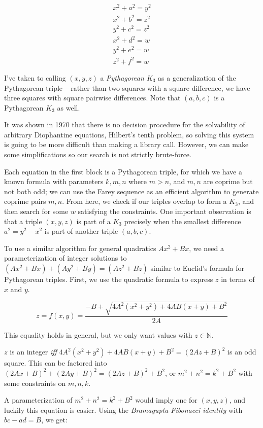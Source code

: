 \documentclass[a4paper]{amsproc}
\theoremstyle{plain}
\newcommand{\N} {\mathbb{N}}
\begin{document}
$$
\begin{matrix}
x^2 + a^2 = y^2 \\
x^2 + b^2 = z^2 \\
y^2 + c^2 = z^2 \\
x^2 + d^2 = w \\
y^2 + e^2 = w \\
z^2 + f^2 = w
\end{matrix}
$$

I've taken to calling $(x,y,z)$ a \textit{Pythagorean $K_3$} as a generalization of the Pythagorean triple --
rather than two squares with a square difference, we have three squares with square pairwise differences.
Note that $(a,b,c)$ is a Pythagorean $K_3$ as well.

It was shown in 1970 that there is no decision procedure for the solvability of arbitrary Diophantine equations, Hilbert's tenth problem, so solving this system is going to be more difficult than making a library call.
However, we can make some simplifications so our search is not strictly brute-force.

Each equation in the first block is a Pythagorean triple, for which we have a known formula with parameters $k,m,n$ where $m > n$, and $m,n$ are coprime but not both odd;
we can use the Farey sequence as an efficient algorithm to generate coprime pairs $m,n$.
From here, we check if our triples overlap to form a $K_3$, and then search for some $w$ satisfying the constraints.
One important observation is that a triple $(x,y,z)$ is part of a $K_3$ precisely when the smallest difference $a^2 = y^2 - x^2$ is part of another
triple $(a,b,c)$.

To use a similar algorithm for general quadratics $Ax^2+Bx$, we need a parameterization of integer solutions to $(Ax^2+Bx) + (Ay^2+By) = (Az^2+Bz)$
similar to Euclid's formula for Pythagorean triples.
First, we use the quadratic formula to express $z$ in terms of $x$ and $y$.

$$z = f(x,y) = \frac{-B+\sqrt{4A^2(x^2+y^2)+4AB(x+y)+B^2}}{2A}$$

This equality holds in general, but we only want values with $z\in\N$.

$z$ is an integer \textit{iff} $4A^2(x^2+y^2)+4AB(x+y)+B^2=(2Az+B)^2$ is an odd square.
This can be factored into $(2Ax+B)^2+(2Ay+B)^2=(2Az+B)^2+B^2$, or $m^2+n^2=k^2+B^2$ with some constraints on $m,n,k$.

A parameterization of $m^2+n^2=k^2+B^2$ would imply one for $(x,y,z)$, and luckily this equation is easier.
Using the \textit{Bramagupta-Fibonacci identity} with ${bc-ad=B}$, we get:
\end{document}
